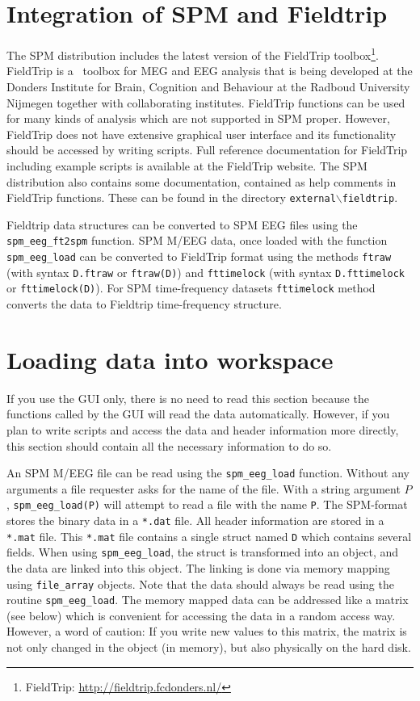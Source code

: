 \section{Integration of SPM and Fieldtrip}
The SPM distribution includes the latest version of the FieldTrip toolbox\footnote{FieldTrip: \url{http://fieldtrip.fcdonders.nl/}}. FieldTrip is a \matlab\ toolbox for MEG and EEG analysis that is being developed at the Donders Institute for Brain, Cognition and Behaviour at the Radboud University Nijmegen together with collaborating institutes. FieldTrip functions can be used for many kinds of analysis which are not supported in SPM proper. However, FieldTrip does not have extensive graphical user interface and its functionality should be accessed by writing scripts. Full reference documentation for FieldTrip including example scripts is available at the FieldTrip website. The SPM distribution also contains some documentation, contained as help comments in FieldTrip functions. These can be found in the directory \texttt{external$\backslash$fieldtrip}. 

Fieldtrip data structures can be converted to SPM EEG files using the \texttt{spm\_eeg\_ft2spm} function. SPM M/EEG data, once loaded with the function \texttt{spm\_eeg\_load} can be converted to FieldTrip format using the methods \texttt{ftraw} (with syntax \texttt{D.ftraw} or \texttt{ftraw(D)}) and \texttt{fttimelock} (with syntax \texttt{D.fttimelock} or \texttt{fttimelock(D)}). For SPM time-frequency datasets \texttt{fttimelock} method converts the data to Fieldtrip time-frequency structure.

\section{Loading data into workspace\label{sec:load}}
If you use the GUI only, there is no need to read this section because the functions called by the GUI will read the data automatically. However, if you plan to write scripts and access the data and header information more directly, this section should contain all the necessary information to do so.

An SPM M/EEG file can be read using the \texttt{spm\_eeg\_load} function. Without any arguments a file requester asks for the name of the file. With a string argument $P$, \texttt{spm\_eeg\_load(P)} will attempt to read a file with the name \texttt{P}. The SPM-format stores the binary data in a \texttt{*.dat} file. All header information are stored in a \texttt{*.mat} file. This \texttt{*.mat} file contains a single struct named \texttt{D} which contains several fields. When using \texttt{spm\_eeg\_load}, the struct is transformed into an object, and the data are linked into this object. The linking is done via memory mapping using \texttt{file\_array} objects. Note that the data should always be read using the routine \texttt{spm\_eeg\_load}. The memory mapped data can be addressed like a matrix (see below) which is convenient for accessing the data in a random access way. However, a word of caution: If you write new values to this matrix, the matrix is not only changed in the object (in memory), but also physically on the hard disk.

